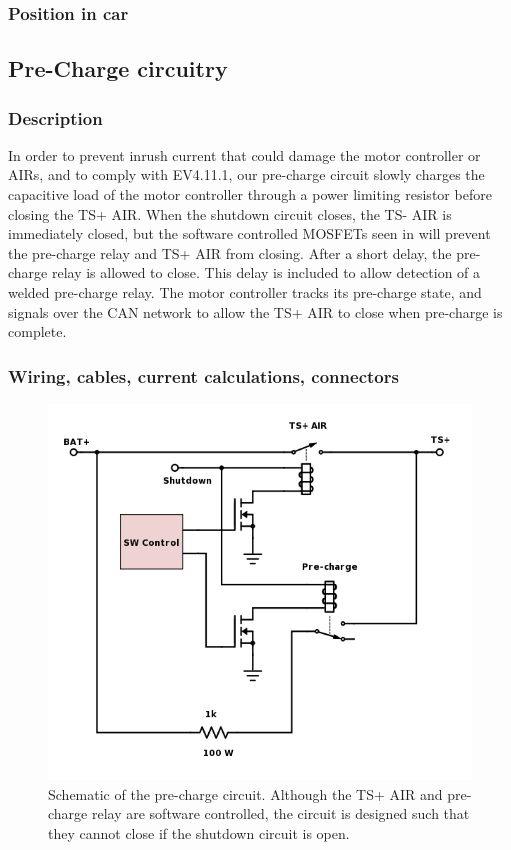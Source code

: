 \documentclass{article}
\begin{document}
\subsubsection{Position in car}

\subsection{Pre-Charge circuitry}\label{pre_charge_circuitry}
\subsubsection{Description}

In order to prevent inrush current that could damage the motor controller or AIRs, and to comply with EV4.11.1, our pre-charge circuit slowly charges the capacitive load of the motor controller through a power limiting resistor before closing the TS+ AIR. When the shutdown circuit closes, the TS- AIR is immediately closed, but the software controlled MOSFETs seen in  will prevent the pre-charge relay and TS+ AIR from closing. After a short delay, the pre-charge relay is allowed to close. This delay is included to allow detection of a welded pre-charge relay. The motor controller tracks its pre-charge state, and signals over the CAN network to allow the TS+ AIR to close when pre-charge is complete. 

\subsubsection{Wiring, cables, current calculations, connectors}

\begin{figure}[H]
    \centering
    \includegraphics[width = 0.7 \textwidth]{precharge_schem}
    \caption{Schematic of the pre-charge circuit. Although the TS+ AIR and pre-charge relay are software controlled, the circuit is designed such that they cannot close if the shutdown circuit is open.}
    \label{fig:precharge_schem}
\end{figure}
\end{document}
